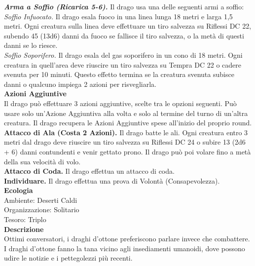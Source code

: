 \begin{multicols}{2}
\emph{\textbf{Arma a Soffio (Ricarica 5-6).}} Il drago usa una delle seguenti armi a soffio:\\
\emph{Soffio Infuocato.} Il drago esala fuoco in una linea lunga 18 metri e larga 1,5 metri. Ogni creatura sulla linea deve effettuare un tiro salvezza su Riflessi DC  22, subendo 45 (13d6) danni da fuoco se fallisce il tiro salvezza, o la metà di questi danni se lo riesce.\\
\emph{Soffio Soporifero.} Il drago esala del gas soporifero in un cono di 18 metri. Ogni creatura in quell'area deve riuscire un tiro salvezza su Tempra DC  22 o cadere svenuta per 10 minuti. Questo effetto termina se la creatura svenuta subisce danni o qualcuno impiega 2 azioni per risvegliarla.\\
\textbf{Azioni Aggiuntive}\\
Il drago può effettuare 3 azioni aggiuntive, scelte tra le opzioni seguenti. Può usare solo un'Azione Aggiuntiva alla volta e solo al termine del turno di un'altra creatura. Il drago recupera le Azioni Aggiuntive spese all'inizio del proprio round.\\
\textbf{Attacco di Ala (Costa 2 Azioni).} Il drago batte le ali. Ogni creatura entro 3 metri dal drago deve riuscire un tiro salvezza su Riflessi DC  24 o subire 13 (2d6 + 6) danni contundenti e venir gettato prono. Il drago può poi volare fino a metà della sua velocità di volo.\\
\textbf{Attacco di Coda.} Il drago effettua un attacco di coda.\\
\textbf{Individuare.} Il drago effettua una prova di Volontà (Consapevolezza).\\
\textbf{Ecologia}\\
Ambiente: Deserti Caldi\\
Organizzazione: Solitario\\
Tesoro: Triplo\\
\textbf{Descrizione}\\
Ottimi conversatori, i draghi d’ottone preferiscono parlare invece che combattere. I draghi d’ottone fanno la tana vicino agli insediamenti umanoidi, dove possono udire le notizie e i pettegolezzi più recenti.\\



\end{multicols}
